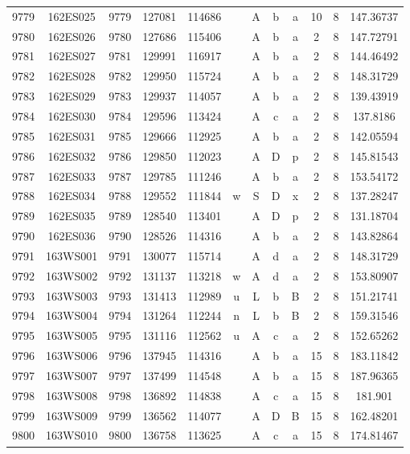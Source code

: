 \begin{tabular}{|*{12}{c|}}
9779 & 162ES025 & 9779 & 127081 & 114686 &  & A & b & a & 10 & 8 & 147.36737 \\ 
9780 & 162ES026 & 9780 & 127686 & 115406 &  & A & b & a & 2 & 8 & 147.72791 \\ 
9781 & 162ES027 & 9781 & 129991 & 116917 &  & A & b & a & 2 & 8 & 144.46492 \\ 
9782 & 162ES028 & 9782 & 129950 & 115724 &  & A & b & a & 2 & 8 & 148.31729 \\ 
9783 & 162ES029 & 9783 & 129937 & 114057 &  & A & b & a & 2 & 8 & 139.43919 \\ 
9784 & 162ES030 & 9784 & 129596 & 113424 &  & A & c & a & 2 & 8 & 137.8186 \\ 
9785 & 162ES031 & 9785 & 129666 & 112925 &  & A & b & a & 2 & 8 & 142.05594 \\ 
9786 & 162ES032 & 9786 & 129850 & 112023 &  & A & D & p & 2 & 8 & 145.81543 \\ 
9787 & 162ES033 & 9787 & 129785 & 111246 &  & A & b & a & 2 & 8 & 153.54172 \\ 
9788 & 162ES034 & 9788 & 129552 & 111844 & w & S & D & x & 2 & 8 & 137.28247 \\ 
9789 & 162ES035 & 9789 & 128540 & 113401 &  & A & D & p & 2 & 8 & 131.18704 \\ 
9790 & 162ES036 & 9790 & 128526 & 114316 &  & A & b & a & 2 & 8 & 143.82864 \\ 
9791 & 163WS001 & 9791 & 130077 & 115714 &  & A & d & a & 2 & 8 & 148.31729 \\ 
9792 & 163WS002 & 9792 & 131137 & 113218 & w & A & d & a & 2 & 8 & 153.80907 \\ 
9793 & 163WS003 & 9793 & 131413 & 112989 & u & L & b & B & 2 & 8 & 151.21741 \\ 
9794 & 163WS004 & 9794 & 131264 & 112244 & n & L & b & B & 2 & 8 & 159.31546 \\ 
9795 & 163WS005 & 9795 & 131116 & 112562 & u & A & c & a & 2 & 8 & 152.65262 \\ 
9796 & 163WS006 & 9796 & 137945 & 114316 &  & A & b & a & 15 & 8 & 183.11842 \\ 
9797 & 163WS007 & 9797 & 137499 & 114548 &  & A & b & a & 15 & 8 & 187.96365 \\ 
9798 & 163WS008 & 9798 & 136892 & 114838 &  & A & c & a & 15 & 8 & 181.901 \\ 
9799 & 163WS009 & 9799 & 136562 & 114077 &  & A & D & B & 15 & 8 & 162.48201 \\ 
9800 & 163WS010 & 9800 & 136758 & 113625 &  & A & c & a & 15 & 8 & 174.81467 \\ 

\end{tabular}
